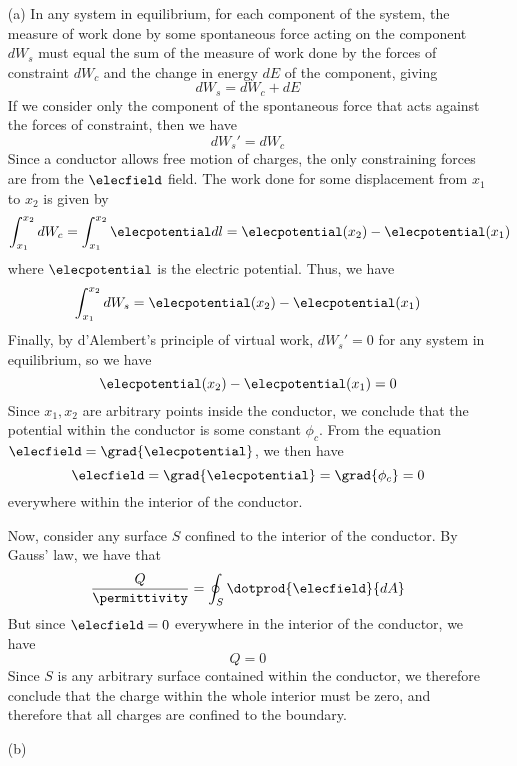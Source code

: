 \begin{itemize}
\item[(a)] In any system in equilibrium, for each component of the system,
  the measure of work done by some spontaneous force acting on the
  component $dW_s$ must equal the sum of the measure of work done by
  the forces of constraint $dW_c$ and the change in energy $dE$ of the
  component, giving
  \[
  dW_s = dW_c + dE
  \]
  If we consider only the component of the spontaneous force that acts
  against the forces of constraint, then we have
  \[
  dW_s' = dW_c
  \]
  Since a conductor allows free motion of charges, the only
  constraining forces are from the $\elecfield$ field.  The work done
  for some displacement from $x_1$ to $x_2$ is given by
  \[
  \int_{x_1}^{x_2} dW_c
  =
  \int_{x_1}^{x_2} \elecpotential dl
  =
  \elecpotential(x_2) - \elecpotential(x_1)
  \]
  where $\elecpotential$ is the electric potential.  Thus, we have
  \[
  \int_{x_1}^{x_2} dW_s = \elecpotential(x_2) - \elecpotential(x_1)
  \]
  Finally, by d'Alembert's principle of virtual work, $dW_s' = 0$ for any
  system in equilibrium, so we have
  \[
  \elecpotential(x_2) - \elecpotential(x_1) = 0
  \]
  Since $x_1,x_2$ are arbitrary points inside the conductor, we
  conclude that the potential within the conductor is some constant
  $\phi_c$.  From the equation $\elecfield = \grad{\elecpotential}$, we
  then have
  \[
  \elecfield = \grad{\elecpotential} = \grad{\phi_c} = 0
  \]
  everywhere within the interior of the conductor.

  Now, consider any surface $S$ confined to the interior of the
  conductor.  By Gauss' law, we have that
  \[
  \frac{Q}{\permittivity} = \oint_S \dotprod{\elecfield}{dA}
  \]
  But since $\elecfield = 0$ everywhere in the interior of the
  conductor, we have
  \[
  Q = 0
  \]
  Since $S$ is any arbitrary surface contained within the conductor,
  we therefore conclude that the charge within the whole interior must
  be zero, and therefore that all charges are confined to the boundary.


\item[(b)]


\end{itemize}
